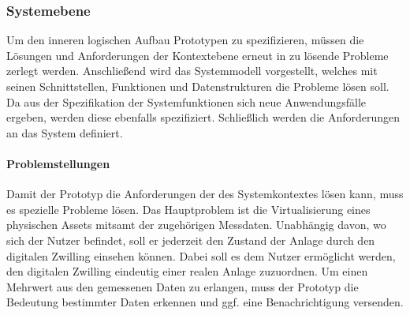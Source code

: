\subsubsection{Systemebene}
Um den inneren logischen Aufbau Prototypen zu spezifizieren, müssen die Lösungen und Anforderungen der Kontextebene erneut in zu lösende Probleme zerlegt werden. Anschließend wird das Systemmodell vorgestellt, welches mit seinen Schnittstellen, Funktionen und Datenstrukturen die Probleme lösen soll. Da aus der Spezifikation der Systemfunktionen sich neue Anwendungsfälle ergeben, werden diese ebenfalls spezifiziert. Schließlich werden die Anforderungen an das System definiert.

\paragraph{Problemstellungen} Damit der Prototyp die Anforderungen der des Systemkontextes lösen kann, muss es spezielle Probleme lösen. Das Hauptproblem ist die Virtualisierung eines physischen Assets mitsamt der zugehörigen Messdaten. Unabhängig davon, wo sich der Nutzer befindet, soll er jederzeit den Zustand der Anlage durch den digitalen Zwilling einsehen können. Dabei soll es dem Nutzer ermöglicht werden, den digitalen Zwilling eindeutig einer realen Anlage zuzuordnen. Um einen Mehrwert aus den gemessenen Daten zu erlangen, muss der Prototyp die Bedeutung bestimmter Daten erkennen und ggf. eine Benachrichtigung versenden.


